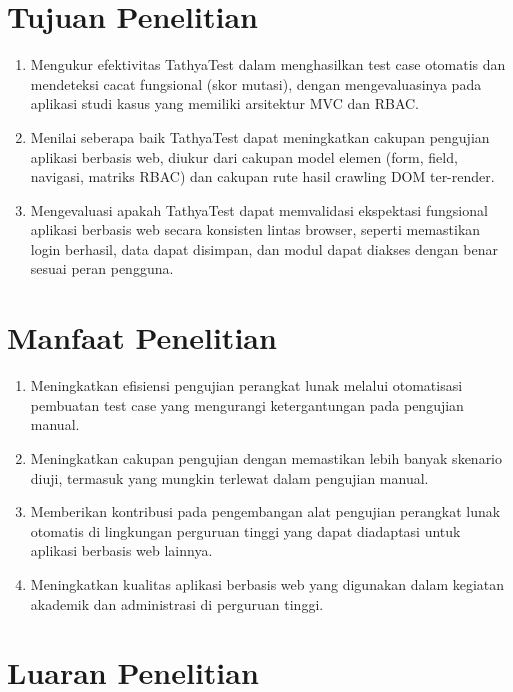 \section{Tujuan Penelitian}\label{tujuan-penelitian}

\begin{enumerate}
    \item Mengukur efektivitas TathyaTest dalam menghasilkan test case otomatis dan mendeteksi cacat fungsional (skor mutasi), dengan mengevaluasinya pada aplikasi studi kasus yang memiliki arsitektur MVC dan RBAC.
    \item Menilai seberapa baik TathyaTest dapat meningkatkan cakupan pengujian aplikasi berbasis web, diukur dari cakupan model elemen (form, field, navigasi, matriks RBAC) dan cakupan rute hasil crawling DOM ter-render.
    \item Mengevaluasi apakah TathyaTest dapat memvalidasi ekspektasi fungsional aplikasi berbasis web secara konsisten lintas browser, seperti memastikan login berhasil, data dapat disimpan, dan modul dapat diakses dengan benar sesuai peran pengguna.
\end{enumerate}

\section{Manfaat Penelitian}\label{manfaat-penelitian}

\begin{enumerate}
    \item Meningkatkan efisiensi pengujian perangkat lunak melalui otomatisasi pembuatan test case yang mengurangi ketergantungan pada pengujian manual.
    \item Meningkatkan cakupan pengujian dengan memastikan lebih banyak skenario diuji, termasuk yang mungkin terlewat dalam pengujian manual.
    \item Memberikan kontribusi pada pengembangan alat pengujian perangkat lunak otomatis di lingkungan perguruan tinggi yang dapat diadaptasi untuk aplikasi berbasis web lainnya.
    \item Meningkatkan kualitas aplikasi berbasis web yang digunakan dalam kegiatan akademik dan administrasi di perguruan tinggi.
\end{enumerate}

\section{Luaran Penelitian}\label{luaran-penelitian}

